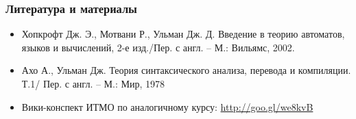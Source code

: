 \documentclass{beamer}
\begin{document}
\begin{frame}[fragile]
  \transwipe[direction=90]
  \frametitle{Литература и материалы}
  \begin{itemize}
    \item Хопкрофт Дж. Э., Мотвани Р., Ульман Дж. Д. Введение в теорию автоматов, языков и вычислений, 2-е изд./Пер. с англ. – М.: Вильямс, 2002.
    \item Ахо А., Ульман Дж. Теория синтаксического анализа, перевода и компиляции. Т.1/ Пер. с англ. – М.: Мир, 1978
    \item Вики-конспект ИТМО по аналогичному курсу: \href{http://goo.gl/we8kvB}{http://goo.gl/we8kvB}
  \end{itemize}
\end{frame}
\end{document}
